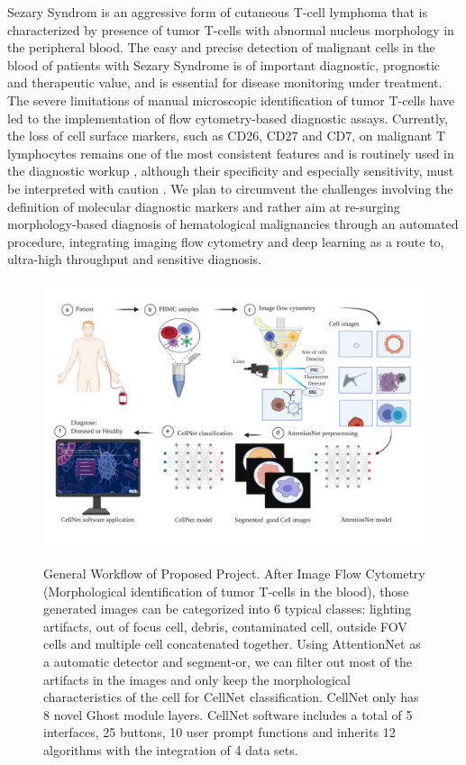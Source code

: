 Sezary Syndrom is an aggressive form of cutaneous T-cell lymphoma that is characterized by presence of tumor T-cells with abnormal nucleus morphology in the peripheral blood. The easy and precise detection of malignant cells in the blood of patients with Sezary Syndrome is of important diagnostic, prognostic and therapeutic value, and is essential for disease monitoring under treatment\cite{6}\cite{7}. The severe limitations of manual microscopic identification of tumor T-cells have led to the implementation of flow cytometry-based diagnostic assays. Currently, the loss of cell surface markers, such as CD26, CD27 and CD7, on malignant T lymphocytes remains one of the most consistent features and is routinely used in the diagnostic workup \cite{12}, although their specificity and especially sensitivity, must be interpreted with caution \cite{11}. We plan to circumvent the challenges involving the definition of molecular diagnostic markers and rather aim at re-surging morphology-based diagnosis of hematological malignancies through an automated procedure, integrating imaging flow cytometry and deep learning as a route to, ultra-high throughput and sensitive diagnosis.
 
\label{sub:figures}
\begin{figure}[ht]
	\begin{center}
	\includegraphics[width=\textwidth]{thesis-template-master/images/general workflow2.pdf}
	\label{fig:lenna}
	\end{center}
	\caption{General Workflow of Proposed Project. After Image Flow Cytometry (Morphological identification of tumor T-cells in the blood), those generated images can be categorized into 6 typical classes: lighting artifacts, out of focus cell, debris, contaminated cell, outside FOV cells  and multiple cell concatenated together. Using AttentionNet as a automatic detector and segment-or, we can filter out most of the artifacts in the images and only keep the morphological characteristics of the cell for CellNet classification. CellNet only has 8 novel Ghost module layers. CellNet software includes a total of 5 interfaces, 25 buttons, 10 user prompt functions and inherits 12 algorithms with the integration of 4 data sets.}
	\label{fig:lennas}
\end{figure}




